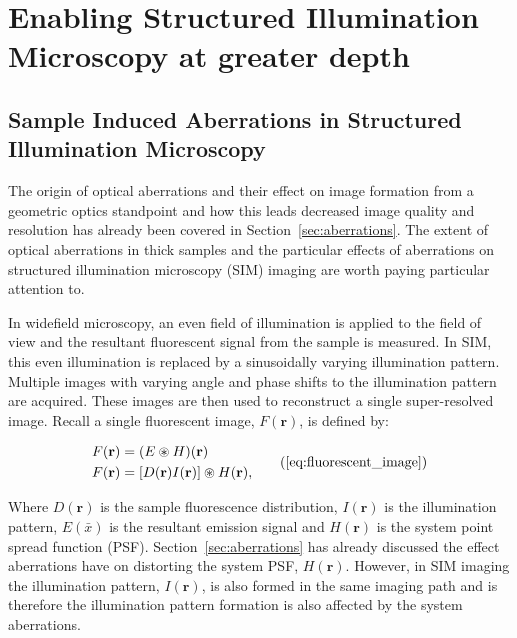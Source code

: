 \chapter{Enabling Structured Illumination Microscopy at greater depth}

\section{Sample Induced Aberrations in Structured Illumination Microscopy}
\label{sec:sample_aberrations_SIM}

The origin of optical aberrations and their effect on image
formation from a geometric optics standpoint and how this leads 
decreased image quality and resolution has already been covered 
in Section~\ref{sec:aberrations}. The extent of optical 
aberrations in thick samples and the particular effects of
aberrations on structured illumination microscopy (SIM) imaging 
are worth paying particular attention to. 

In widefield microscopy, an even field of illumination is 
applied to the field of view and the resultant fluorescent
signal from the sample is measured. In SIM, this even 
illumination is replaced by a sinusoidally varying
illumination pattern. Multiple images with varying angle 
and phase shifts to the illumination pattern are acquired. 
These images are then used to reconstruct a single 
super-resolved image\cite{gustafsson2000surpassing,gustafsson2008three}.
Recall a single fluorescent image, $F(\textbf{r})$, is 
defined by:

\begin{equation}
\begin{split}
F(\textbf{r}) &= (E \circledast H)(\textbf{r})\\
F(\textbf{r}) &= [D(\textbf{r})I(\textbf{r})] \circledast H(\textbf{r}),\\
\end{split}\tag{\ref{eq:fluorescent_image}}
\end{equation}

Where $D(\textbf{r})$ is the sample fluorescence distribution, 
$I(\textbf{r})$ is the illumination pattern, $E(\bar{x})$ is
the resultant emission signal and $H(\textbf{r})$ is the system 
point spread function (PSF). Section~\ref{sec:aberrations} has already
discussed the effect aberrations have on distorting the system
PSF, $H(\textbf{r})$. However, in SIM imaging the illumination 
pattern, $I(\textbf{r})$, is also formed in the same imaging path
and is therefore the illumination pattern formation is also 
affected by the system aberrations.

